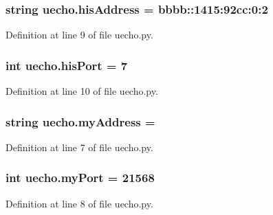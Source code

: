 \subsubsection[{\texorpdfstring{his\+Address}{hisAddress}}]{\setlength{\rightskip}{0pt plus 5cm}string uecho.\+his\+Address = \textquotesingle{}bbbb\+::1415\+:92cc\+:0\+:2\textquotesingle{}}\hypertarget{namespaceuecho_a278882dc4c144edce9069b276890d7e4}{}\label{namespaceuecho_a278882dc4c144edce9069b276890d7e4}


Definition at line 9 of file uecho.\+py.

\subsubsection[{\texorpdfstring{his\+Port}{hisPort}}]{\setlength{\rightskip}{0pt plus 5cm}int uecho.\+his\+Port = 7}\hypertarget{namespaceuecho_a0510f769062a25f06d501c2ddc33d745}{}\label{namespaceuecho_a0510f769062a25f06d501c2ddc33d745}


Definition at line 10 of file uecho.\+py.

\subsubsection[{\texorpdfstring{my\+Address}{myAddress}}]{\setlength{\rightskip}{0pt plus 5cm}string uecho.\+my\+Address = \textquotesingle{}\textquotesingle{}}\hypertarget{namespaceuecho_a43b6154ddf23a0edde1c7b2220053377}{}\label{namespaceuecho_a43b6154ddf23a0edde1c7b2220053377}


Definition at line 7 of file uecho.\+py.

\subsubsection[{\texorpdfstring{my\+Port}{myPort}}]{\setlength{\rightskip}{0pt plus 5cm}int uecho.\+my\+Port = 21568}\hypertarget{namespaceuecho_ac672349797c2218d1bed91c6a9971bbc}{}\label{namespaceuecho_ac672349797c2218d1bed91c6a9971bbc}


Definition at line 8 of file uecho.\+py.

